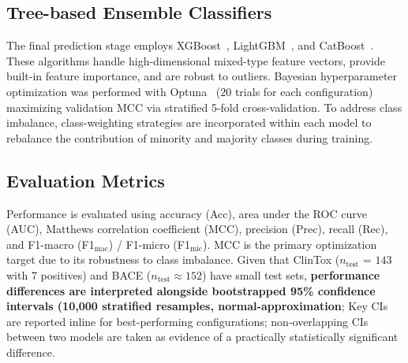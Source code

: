 \documentclass[9pt,twocolumn,conference]{IEEEtran}
\begin{document}
\subsection{Tree-based Ensemble Classifiers}
The final prediction stage employs XGBoost~\cite{chen2016xgboost}, LightGBM~\cite{ke2017lightgbm}, and CatBoost~\cite{prokhorenkova2018catboost}. These algorithms handle high-dimensional mixed-type feature vectors, provide built-in feature importance, and are robust to outliers. Bayesian hyperparameter optimization was performed with Optuna~\cite{akiba2019optuna} ($20$ trials for each configuration) maximizing validation MCC via stratified 5-fold cross-validation. To address class imbalance, class-weighting strategies are incorporated within each model to rebalance the contribution of minority and majority classes during training.
\subsection{Evaluation Metrics}
Performance is evaluated using accuracy (Acc), area under the ROC curve (AUC), Matthews correlation coefficient (MCC), precision (Prec), recall (Rec), and F1-macro (F1$_\text{mac}$) / F1-micro (F1$_\text{mic}$). MCC is the primary optimization target due to its robustness to class imbalance. %
Given that ClinTox ($n_\text{test}$ = $143$ with 7 positives) and BACE ($n_\text{test} \approx 152$) have small test sets, \textbf{performance differences are interpreted alongside bootstrapped 95\% confidence intervals (10{,}000 stratified resamples, normal-approximation}; Key CIs are reported inline for best-performing configurations; non-overlapping CIs between two models are taken as evidence of a practically statistically significant difference.

\end{document}
